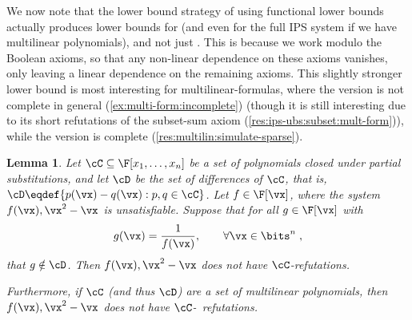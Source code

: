 \documentclass[11pt]{article}
\numberwithin{equation}{section}
\newtheorem{lemma}[theorem]{Lemma}
\theoremstyle{definition}
\theoremstyle{plain}
\begin{document}
We now note that the lower bound strategy of using functional lower bounds actually produces lower bounds for \lbIPS (and even for the full IPS system if we have multilinear polynomials), and not just \lIPS.  This is because we work modulo the Boolean axioms, so that any non-linear dependence on these axioms vanishes, only leaving a linear dependence on the remaining axioms.  This slightly stronger lower bound is most interesting for multilinear-formulas, where the \lIPS version is not complete in general (\autoref{ex:multi-form:incomplete}) (though it is still interesting due to its short refutations of the subset-sum axiom (\autoref{res:ips-ubs:subset:mult-form})), while the \lbIPS version is complete (\autoref{res:multilin:simulate-sparse}).

\begin{lemma}\label{res:lbs-fn_lbs-ips:lbIPS}
        Let $\cC\subseteq\F[x_1,\ldots,x_n]$ be a set of polynomials closed under partial substitutions, and let $\cD$ be the set of differences of $\cC$, that is, $\cD\eqdef \{p(\vx)-q(\vx): p,q\in\cC\}$. Let $f\in\F[\vx]$, where the system $f(\vx),\vx^2-\vx$ is unsatisfiable.  Suppose that for all $g\in\F[\vx]$ with
        \[
                g(\vx)=\frac{1}{f(\vx)},\qquad \forall \vx\in\bits^n\;,
        \]
        that $g\notin \cD$.  Then $f(\vx),\vx^2-\vx$ does not have $\cC$-\lbIPS refutations.

        Furthermore, if $\cC$ (and thus $\cD$) are a set of multilinear polynomials, then $f(\vx),\vx^2-\vx$ does not have $\cC$-\IPS\ refutations.
\end{lemma}
\end{document}
